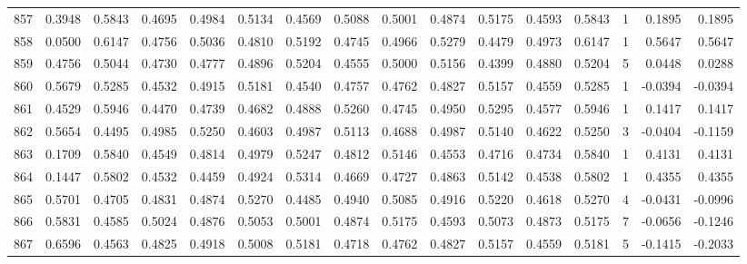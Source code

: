 \begin{tabular}{lrrrrrrrrrrrrrrr}
857 &      0.3948 &  0.5843 &  0.4695 &  0.4984 &  0.5134 &  0.4569 &  0.5088 &  0.5001 &  0.4874 &  0.5175 &   0.4593 &     0.5843 &      1 &                    0.1895 &                     0.1895 \\
858 &      0.0500 &  0.6147 &  0.4756 &  0.5036 &  0.4810 &  0.5192 &  0.4745 &  0.4966 &  0.5279 &  0.4479 &   0.4973 &     0.6147 &      1 &                    0.5647 &                     0.5647 \\
859 &      0.4756 &  0.5044 &  0.4730 &  0.4777 &  0.4896 &  0.5204 &  0.4555 &  0.5000 &  0.5156 &  0.4399 &   0.4880 &     0.5204 &      5 &                    0.0448 &                     0.0288 \\
860 &      0.5679 &  0.5285 &  0.4532 &  0.4915 &  0.5181 &  0.4540 &  0.4757 &  0.4762 &  0.4827 &  0.5157 &   0.4559 &     0.5285 &      1 &                   -0.0394 &                    -0.0394 \\
861 &      0.4529 &  0.5946 &  0.4470 &  0.4739 &  0.4682 &  0.4888 &  0.5260 &  0.4745 &  0.4950 &  0.5295 &   0.4577 &     0.5946 &      1 &                    0.1417 &                     0.1417 \\
862 &      0.5654 &  0.4495 &  0.4985 &  0.5250 &  0.4603 &  0.4987 &  0.5113 &  0.4688 &  0.4987 &  0.5140 &   0.4622 &     0.5250 &      3 &                   -0.0404 &                    -0.1159 \\
863 &      0.1709 &  0.5840 &  0.4549 &  0.4814 &  0.4979 &  0.5247 &  0.4812 &  0.5146 &  0.4553 &  0.4716 &   0.4734 &     0.5840 &      1 &                    0.4131 &                     0.4131 \\
864 &      0.1447 &  0.5802 &  0.4532 &  0.4459 &  0.4924 &  0.5314 &  0.4669 &  0.4727 &  0.4863 &  0.5142 &   0.4538 &     0.5802 &      1 &                    0.4355 &                     0.4355 \\
865 &      0.5701 &  0.4705 &  0.4831 &  0.4874 &  0.5270 &  0.4485 &  0.4940 &  0.5085 &  0.4916 &  0.5220 &   0.4618 &     0.5270 &      4 &                   -0.0431 &                    -0.0996 \\
866 &      0.5831 &  0.4585 &  0.5024 &  0.4876 &  0.5053 &  0.5001 &  0.4874 &  0.5175 &  0.4593 &  0.5073 &   0.4873 &     0.5175 &      7 &                   -0.0656 &                    -0.1246 \\
867 &      0.6596 &  0.4563 &  0.4825 &  0.4918 &  0.5008 &  0.5181 &  0.4718 &  0.4762 &  0.4827 &  0.5157 &   0.4559 &     0.5181 &      5 &                   -0.1415 &                    -0.2033 \\

\end{tabular}
